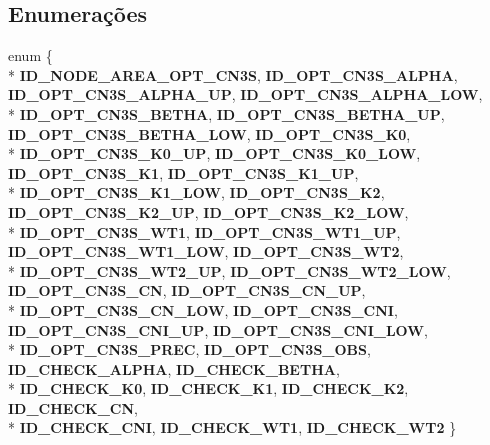 \subsection*{Enumerações}
\begin{DoxyCompactItemize}
\item 
enum \{ \\*
{\bf I\+D\+\_\+\+N\+O\+D\+E\+\_\+\+A\+R\+E\+A\+\_\+\+O\+P\+T\+\_\+\+C\+N3S}, 
{\bf I\+D\+\_\+\+O\+P\+T\+\_\+\+C\+N3\+S\+\_\+\+A\+L\+P\+HA}, 
{\bf I\+D\+\_\+\+O\+P\+T\+\_\+\+C\+N3\+S\+\_\+\+A\+L\+P\+H\+A\+\_\+\+UP}, 
{\bf I\+D\+\_\+\+O\+P\+T\+\_\+\+C\+N3\+S\+\_\+\+A\+L\+P\+H\+A\+\_\+\+L\+OW}, 
\\*
{\bf I\+D\+\_\+\+O\+P\+T\+\_\+\+C\+N3\+S\+\_\+\+B\+E\+T\+HA}, 
{\bf I\+D\+\_\+\+O\+P\+T\+\_\+\+C\+N3\+S\+\_\+\+B\+E\+T\+H\+A\+\_\+\+UP}, 
{\bf I\+D\+\_\+\+O\+P\+T\+\_\+\+C\+N3\+S\+\_\+\+B\+E\+T\+H\+A\+\_\+\+L\+OW}, 
{\bf I\+D\+\_\+\+O\+P\+T\+\_\+\+C\+N3\+S\+\_\+\+K0}, 
\\*
{\bf I\+D\+\_\+\+O\+P\+T\+\_\+\+C\+N3\+S\+\_\+\+K0\+\_\+\+UP}, 
{\bf I\+D\+\_\+\+O\+P\+T\+\_\+\+C\+N3\+S\+\_\+\+K0\+\_\+\+L\+OW}, 
{\bf I\+D\+\_\+\+O\+P\+T\+\_\+\+C\+N3\+S\+\_\+\+K1}, 
{\bf I\+D\+\_\+\+O\+P\+T\+\_\+\+C\+N3\+S\+\_\+\+K1\+\_\+\+UP}, 
\\*
{\bf I\+D\+\_\+\+O\+P\+T\+\_\+\+C\+N3\+S\+\_\+\+K1\+\_\+\+L\+OW}, 
{\bf I\+D\+\_\+\+O\+P\+T\+\_\+\+C\+N3\+S\+\_\+\+K2}, 
{\bf I\+D\+\_\+\+O\+P\+T\+\_\+\+C\+N3\+S\+\_\+\+K2\+\_\+\+UP}, 
{\bf I\+D\+\_\+\+O\+P\+T\+\_\+\+C\+N3\+S\+\_\+\+K2\+\_\+\+L\+OW}, 
\\*
{\bf I\+D\+\_\+\+O\+P\+T\+\_\+\+C\+N3\+S\+\_\+\+W\+T1}, 
{\bf I\+D\+\_\+\+O\+P\+T\+\_\+\+C\+N3\+S\+\_\+\+W\+T1\+\_\+\+UP}, 
{\bf I\+D\+\_\+\+O\+P\+T\+\_\+\+C\+N3\+S\+\_\+\+W\+T1\+\_\+\+L\+OW}, 
{\bf I\+D\+\_\+\+O\+P\+T\+\_\+\+C\+N3\+S\+\_\+\+W\+T2}, 
\\*
{\bf I\+D\+\_\+\+O\+P\+T\+\_\+\+C\+N3\+S\+\_\+\+W\+T2\+\_\+\+UP}, 
{\bf I\+D\+\_\+\+O\+P\+T\+\_\+\+C\+N3\+S\+\_\+\+W\+T2\+\_\+\+L\+OW}, 
{\bf I\+D\+\_\+\+O\+P\+T\+\_\+\+C\+N3\+S\+\_\+\+CN}, 
{\bf I\+D\+\_\+\+O\+P\+T\+\_\+\+C\+N3\+S\+\_\+\+C\+N\+\_\+\+UP}, 
\\*
{\bf I\+D\+\_\+\+O\+P\+T\+\_\+\+C\+N3\+S\+\_\+\+C\+N\+\_\+\+L\+OW}, 
{\bf I\+D\+\_\+\+O\+P\+T\+\_\+\+C\+N3\+S\+\_\+\+C\+NI}, 
{\bf I\+D\+\_\+\+O\+P\+T\+\_\+\+C\+N3\+S\+\_\+\+C\+N\+I\+\_\+\+UP}, 
{\bf I\+D\+\_\+\+O\+P\+T\+\_\+\+C\+N3\+S\+\_\+\+C\+N\+I\+\_\+\+L\+OW}, 
\\*
{\bf I\+D\+\_\+\+O\+P\+T\+\_\+\+C\+N3\+S\+\_\+\+P\+R\+EC}, 
{\bf I\+D\+\_\+\+O\+P\+T\+\_\+\+C\+N3\+S\+\_\+\+O\+BS}, 
{\bf I\+D\+\_\+\+C\+H\+E\+C\+K\+\_\+\+A\+L\+P\+HA}, 
{\bf I\+D\+\_\+\+C\+H\+E\+C\+K\+\_\+\+B\+E\+T\+HA}, 
\\*
{\bf I\+D\+\_\+\+C\+H\+E\+C\+K\+\_\+\+K0}, 
{\bf I\+D\+\_\+\+C\+H\+E\+C\+K\+\_\+\+K1}, 
{\bf I\+D\+\_\+\+C\+H\+E\+C\+K\+\_\+\+K2}, 
{\bf I\+D\+\_\+\+C\+H\+E\+C\+K\+\_\+\+CN}, 
\\*
{\bf I\+D\+\_\+\+C\+H\+E\+C\+K\+\_\+\+C\+NI}, 
{\bf I\+D\+\_\+\+C\+H\+E\+C\+K\+\_\+\+W\+T1}, 
{\bf I\+D\+\_\+\+C\+H\+E\+C\+K\+\_\+\+W\+T2}
 \}
\end{DoxyCompactItemize}
